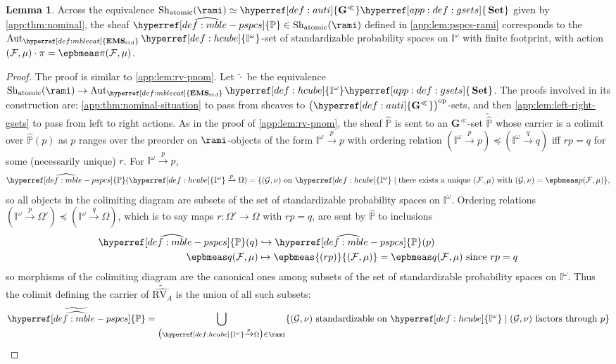 \documentclass[
  sigconf,
  screen, ]{acmart}
\theoremstyle{definition}
\newtheorem{lemma}[theorem]{Lemma}
\newcommand\Aut{\operatorname{Aut}}
\newcommand\calF{\mathcal F}
\newcommand\calG{\mathcal G}
\newcommand\nref[2]{\hyperref[#1]{#2}} \newcommand\checkhigh{{\huge{\color{red}\textbf{TODO: check}}}}
\newcommand\Shjat{\operatorname{Sh}_{{\rm atomic}}}
\newcommand\tgsets[1]{{#1{\nref{app:def:gsets}{\,\Set}}}}
\newcommand\op{^{\rm op}}
\newcommand\Set{\mathbf{Set}}
\newcommand\texhcube{{{{\mathbb I}^\omega}}}
\newcommand\hcube{{\nref{def:hcube}{\texhcube}}}
\newcommand\texStdMble{\mathbf{EMS}_{\rm std}}
\newcommand\StdMble{{\nref{def:mblecat}{\texStdMble}}}
\newcommand\RV{\mathrm{RV}}
\newcommand\texpspcs{\mathbb P}
\newcommand\pspcs{{\nref{def:mble-pspcs}{\texpspcs}}}
\newcommand\texauti{\mathbf{G}^{\ll}}
\newcommand\auti{{\nref{def:auti}{\texauti}}}
\begin{document}
\begin{lemma} \label{app:lem:pspcs-pnom}
  Across the equivalence
  $\Shjat(\rami) \simeq \tgsets{\auti}$
  given by \cref{app:thm:nominal},
  the sheaf
  $\widehat{\pspcs}\in\Shjat(\rami)$
  defined in \cref{app:lem:pspcs-rami}
  corresponds to the $\Aut_{\StdMble}\hcube$-set
  of standardizable probability spaces on $\hcube$ with finite footprint,
  with action $(\calF,\mu)\cdot \pi = \epbmeas\pi{(\calF,\mu)}$.
\end{lemma}
\begin{proof}
  The proof is similar to \cref{app:lem:rv-pnom}.
  Let $\widetilde\cdot$ be the equivalence $\Shjat(\rami)\to \tgsets{\Aut_{\StdMble}\hcube}$.
  The proofs involved in its construction
  are: \cref{app:thm:nominal-situation} to pass from sheaves to $\big(\auti\big)\op$-sets,
  and then \cref{app:lem:left-right-gsets} to pass from left to right actions.
  As in the proof of \cref{app:lem:rv-pnom},
  the sheaf $\widehat{\pspcs}$
  is sent to an $\auti$-set $\widetilde{\widehat{\pspcs}}$
  whose carrier is a colimit over $\widehat\pspcs(p)$
  as $p$ ranges over the preorder on $\rami$-objects
  of the form
  $\hcube\xrightarrow p p$
  with ordering relation
  $(\hcube\xrightarrow p p)\preceq (\hcube\xrightarrow q q)$
  iff $rp = q$ for some (necessarily unique) $r$.
  For $\hcube\xrightarrow p p$,
  \[
    \widehat{\pspcs}(\hcube\xrightarrow p \Omega)
    = \{ (\calG,\nu)\text{ on }\hcube
    \mid \text{there exists a unique $(\calF,\mu)$ with $(\calG,\nu) = \epbmeas p{(\calF,\mu)}$} \},
  \]
  so all objects in the colimiting diagram are subsets of the set of standardizable probability spaces on $\hcube$.
  Ordering relations $(\hcube\xrightarrow p\Omega')\preceq (\hcube\xrightarrow q\Omega)$,
  which is to say maps $r : \Omega'\to\Omega$ with $rp = q$,
  are sent by $\widehat\pspcs$ to inclusions
  \begin{align*}
    \widehat\pspcs(q)
    &\hookrightarrow
    \widehat\pspcs(p)
    \\
    \epbmeas q{(\calF,\mu)}
    &\mapsto
    \epbmeas {(rp)}{(\calF,\mu)} = \epbmeas q{(\calF,\mu)}\text{ since $rp = q$}
  \end{align*}
  so morphisms of the colimiting diagram are
  the canonical ones among subsets of the set of standardizable probability spaces on $\hcube$.
  Thus the colimit defining the carrier of $\widetilde{\widehat{\RV_A}}$
  is the union of all such subsets:
  \begin{align*}
    \widetilde{\widehat{\pspcs}}
    &= \bigcup_{\big(\hcube\xrightarrow p\Omega\big)\in\rami}\{(\calG,\nu)\text{ standardizable on }\hcube\mid \text{$(\calG,\nu)$ factors through $p$}\}\\

\end{align*}
\end{proof}
\end{document}
